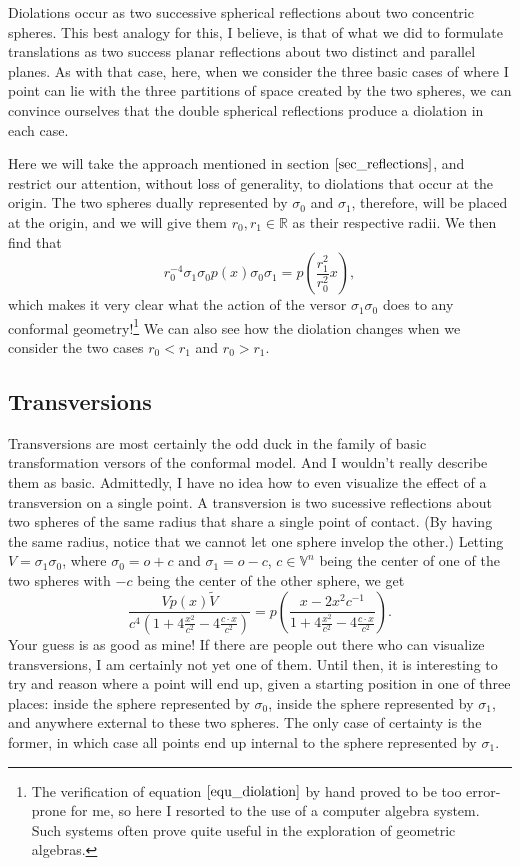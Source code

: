 \documentclass[12pt]{article}
\newcommand{\V}{\mathbb{V}}
\newcommand{\R}{\mathbb{R}}
\newcommand{\nvao}{o}
\begin{document}
Diolations occur as two successive spherical reflections about two concentric
spheres.  This best analogy for this, I believe, is that of what we did to formulate
translations as two success planar reflections about two distinct and parallel planes.
As with that case, here, when we consider the three basic cases of where I point can lie
with the three partitions of space created by the two spheres, we can convince ourselves
that the double spherical reflections produce a diolation in each case.

Here we will take the approach mentioned in section $\eqref{sec_reflections}$,
and restrict our attention, without loss of generality, to diolations that occur at the
origin.  The two spheres dually represented by $\sigma_0$ and $\sigma_1$, therefore,
will be placed at the origin, and we will give them $r_0,r_1\in\R$ as their respective radii.
We then find that
\begin{equation}\label{equ_diolation}
r_0^{-4}\sigma_1\sigma_0 p(x)\sigma_0\sigma_1 = p\left(\frac{r_1^2}{r_0^2}x\right),
\end{equation}
which makes it very clear what the action of the versor $\sigma_1\sigma_0$ does
to any conformal geometry!\footnote{The verification of equation $\eqref{equ_diolation}$
by hand proved to be too error-prone for me, so here I resorted to the use of a computer
algebra system.  Such systems often prove quite useful in the exploration of geometric algebras.}
We can also see how the diolation changes when
we consider the two cases $r_0<r_1$ and $r_0>r_1$.

\subsection{Transversions}


Transversions are most certainly the odd duck in the family of basic
transformation versors of the conformal model.  And I wouldn't really
describe them as basic.  Admittedly, I have no idea how to even visualize
the effect of a transversion on a single point.  A transversion is two
sucessive reflections about two spheres of the same radius that share a single point
of contact.  (By having the same radius, notice that we cannot let one sphere
invelop the other.)
Letting $V=\sigma_1\sigma_0$, where $\sigma_0=\nvao+c$
and $\sigma_1=\nvao-c$, $c\in\V^n$ being the center of one of the two spheres
with $-c$ being the center of the other sphere, we get
\begin{equation*}
\frac{Vp(x)\tilde{V}}{c^4(1+4\frac{x^2}{c^2}-4\frac{c\cdot x}{c^2})}
= p\left(\frac{x-2x^2 c^{-1}}{1+4\frac{x^2}{c^2}-4\frac{c\cdot x}{c^2}}\right).
\end{equation*}
Your guess is as good as mine!  If there are people out there who can visualize
transversions, I am certainly not yet one of them.  Until then, it is interesting
to try and reason where a point will end up, given a starting position in one
of three places: inside the sphere represented by $\sigma_0$, inside the
sphere represented by $\sigma_1$, and anywhere external to these two spheres.
The only case of certainty is the former, in which case all points end up internal
to the sphere represented by $\sigma_1$.
\end{document}
